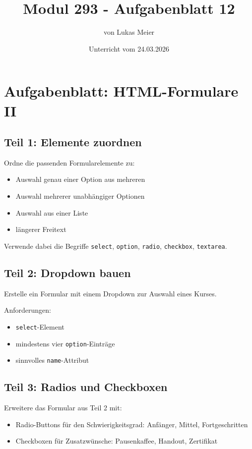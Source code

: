 \documentclass[a4paper,12pt]{article}
\title{Modul 293 - Aufgabenblatt 12}
\author{von Lukas Meier}
\date{Unterricht vom 24.03.2026}
\begin{document}
\maketitle

\section*{Aufgabenblatt: HTML-Formulare II}

\subsection*{Teil 1: Elemente zuordnen}
Ordne die passenden Formularelemente zu:
\begin{itemize}
  \item Auswahl genau einer Option aus mehreren
  \item Auswahl mehrerer unabhängiger Optionen
  \item Auswahl aus einer Liste
  \item längerer Freitext
\end{itemize}

Verwende dabei die Begriffe \texttt{select}, \texttt{option}, \texttt{radio}, \texttt{checkbox}, \texttt{textarea}.

\subsection*{Teil 2: Dropdown bauen}
Erstelle ein Formular mit einem Dropdown zur Auswahl eines Kurses.

Anforderungen:
\begin{itemize}
  \item \texttt{select}-Element
  \item mindestens vier \texttt{option}-Einträge
  \item sinnvolles \texttt{name}-Attribut
\end{itemize}

\subsection*{Teil 3: Radios und Checkboxen}
Erweitere das Formular aus Teil 2 mit:
\begin{itemize}
  \item Radio-Buttons für den Schwierigkeitsgrad: Anfänger, Mittel, Fortgeschritten
  \item Checkboxen für Zusatzwünsche: Pausenkaffee, Handout, Zertifikat
\end{itemize}
\end{document}
